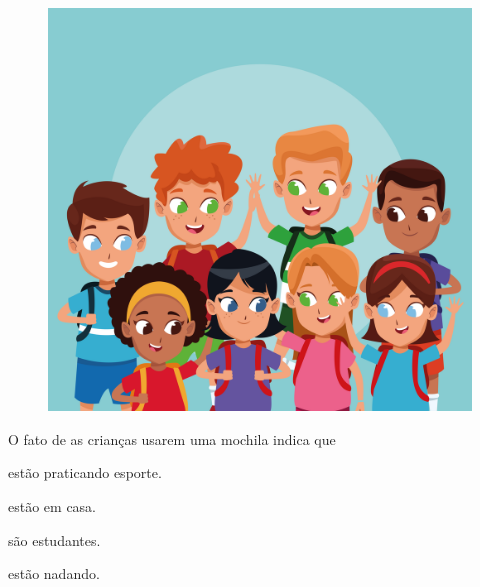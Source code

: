 \begin{figure}[H]
\centering
\includegraphics[width=.7\textwidth]{media/image209.jpg}
\end{figure}

O fato de as crianças usarem uma mochila indica que

\begin{escolha}
\item estão praticando esporte.

\item estão em casa.

\item são estudantes.

\item estão nadando.
\end{escolha}








